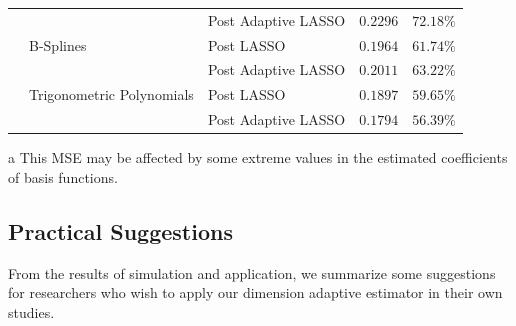 \documentclass[12pt, a4paper]{article}
\theoremstyle{MAstyle} \newtheorem{assumption}{Assumption}[section]
\theoremstyle{MAstyle} \newtheorem{definition}{Definition}[section]
\theoremstyle{MAstyle} \newtheorem{theorem}{Theorem}[section]
\theoremstyle{MAstyle} \newtheorem{corollary}{Corollary}[section]
\begin{document}
\begin{table}[!htbp]
{\begin{threeparttable}
\begin{tabular}{lllcc}
                    &  & Post Adaptive LASSO  & $0.2296$ & $72.18\%$ \\
                    & B-Splines & Post LASSO  & $0.1964$ & $61.74\%$ \\
                    &  & Post Adaptive LASSO  & $0.2011$ & $63.22\%$ \\
                    & Trigonometric Polynomials & Post LASSO  & $0.1897$ & $59.65\%$ \\
                    &  & Post Adaptive LASSO  & $0.1794$ & $56.39\%$ \\
                    \hline  
                    \hline
                \end{tabular}
                \begin{tablenotes}
                    \footnotesize   %
                    \item[a] This MSE may be affected by some extreme values in the estimated coefficients of basis functions.
                \end{tablenotes}
                \end{threeparttable}
                }
            \end{table} 

            \subsection{Practical Suggestions}
            From the results of simulation and application, we summarize some suggestions for researchers who wish to apply our dimension adaptive estimator in their own studies.\\
\end{document}
